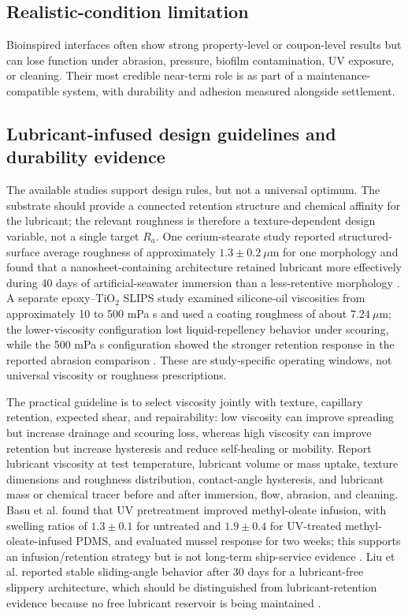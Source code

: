 \subsection{Realistic-condition limitation}
Bioinspired interfaces often show strong property-level or coupon-level results but can lose function under abrasion, pressure, biofilm contamination, UV exposure, or cleaning. Their most credible near-term role is as part of a maintenance-compatible system, with durability and adhesion measured alongside settlement.

\subsection{Lubricant-infused design guidelines and durability evidence}
The available studies support design rules, but not a universal optimum. The substrate should provide a connected retention structure and chemical affinity for the lubricant; the relevant roughness is therefore a texture-dependent design variable, not a single target $R_a$. One cerium-stearate study reported structured-surface average roughness of approximately $1.3\pm0.2~\mu$m for one morphology and found that a nanosheet-containing architecture retained lubricant more effectively during 40 days of artificial-seawater immersion than a less-retentive morphology \cite{yang_facile_2021}. A separate epoxy--TiO$_2$ SLIPS study examined silicone-oil viscosities from approximately 10 to 500 mPa s and used a coating roughness of about $7.24~\mu$m; the lower-viscosity configuration lost liquid-repellency behavior under scouring, while the 500 mPa s configuration showed the stronger retention response in the reported abrasion comparison \cite{yang_construction_2023}. These are study-specific operating windows, not universal viscosity or roughness prescriptions.

The practical guideline is to select viscosity jointly with texture, capillary retention, expected shear, and repairability: low viscosity can improve spreading but increase drainage and scouring loss, whereas high viscosity can improve retention but increase hysteresis and reduce self-healing or mobility. Report lubricant viscosity at test temperature, lubricant volume or mass uptake, texture dimensions and roughness distribution, contact-angle hysteresis, and lubricant mass or chemical tracer before and after immersion, flow, abrasion, and cleaning. Basu et al. found that UV pretreatment improved methyl-oleate infusion, with swelling ratios of $1.3\pm0.1$ for untreated and $1.9\pm0.4$ for UV-treated methyl-oleate-infused PDMS, and evaluated mussel response for two weeks; this supports an infusion/retention strategy but is not long-term ship-service evidence \cite{basu_green_2020}. Liu et al. reported stable sliding-angle behavior after 30 days for a lubricant-free slippery architecture, which should be distinguished from lubricant-retention evidence because no free lubricant reservoir is being maintained \cite{liu_antifouling_2023}.

